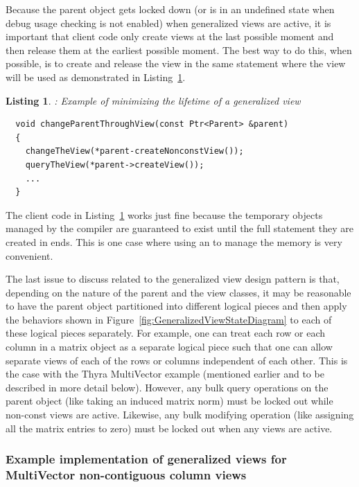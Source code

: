 \documentclass[pdf,ps2pdf,11pt]{SANDreport}
\newtheorem{listing}{Listing}
\begin{document}
Because the parent object gets locked down (or is in an undefined
state when debug usage checking is not enabled) when generalized views
are active, it is important that client code only create views at the
last possible moment and then release them at the earliest possible
moment.  The best way to do this, when possible, is to create and
release the view in the same statement where the view will be used as
demonstrated in Listing~\ref{listing:generalized-view-min-lifetime}.


\begin{listing}:  Example of minimizing the lifetime of a generalized
view  \\
\label{listing:generalized-view-min-lifetime}
{\small\begin{verbatim}
  void changeParentThroughView(const Ptr<Parent> &parent)
  {
    changeTheView(*parent-createNonconstView());
    queryTheView(*parent->createView());
    ...
  }
\end{verbatim}}
\end{listing}


The client code in Listing~\ref{listing:generalized-view-min-lifetime}
works just fine because the temporary {}
objects managed by the compiler are guaranteed to exist until the full
statement they are created in ends.  This is one case where using an
{} to manage the memory is very convenient.

The last issue to discuss related to the generalized view design
pattern is that, depending on the nature of the parent and the view
classes, it may be reasonable to have the parent object partitioned
into different logical pieces and then apply the behaviors shown in
Figure~\ref{fig:GeneralizedViewStateDiagram} to each of these logical
pieces separately.  For example, one can treat each row or each column
in a matrix object as a separate logical piece such that one can allow
separate views of each of the rows or columns independent of each
other.  This is the case with the Thyra MultiVector example (mentioned
earlier and to be described in more detail below).  However, any bulk
query operations on the parent object (like taking an induced matrix
norm) must be locked out while non-const views are active.  Likewise,
any bulk modifying operation (like assigning all the matrix entries to
zero) must be locked out when any views are active.


%
{}\subsubsection*{Example implementation of generalized views for
MultiVector non-contiguous column views}
%
\end{document}
